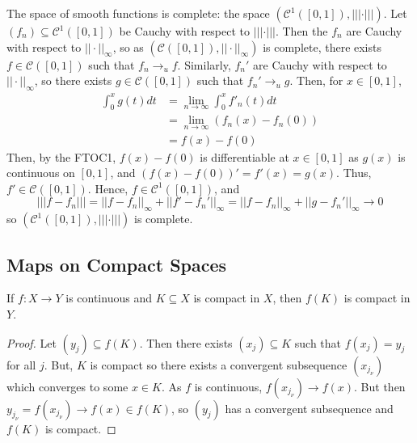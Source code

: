 \begin{example}
    The space of smooth functions is complete: the space $(\mathcal{C}^1([0,1]), |||\cdot|||)$. Let $(f_n) \subseteq \mathcal{C}^1([0,1])$ be Cauchy with respect to $|||\cdot|||$. Then the $f_n$ are Cauchy with respect to $||\cdot||_{\infty}$, so as $(\mathcal{C}([0,1]),||\cdot||_{\infty})$ is complete, there exists $f \in \mathcal{C}([0,1])$ such that $f_n\rightarrow_uf$. Similarly, $f_n'$ are Cauchy with respect to $||\cdot||_{\infty}$, so there exists $g \in \mathcal{C}([0,1])$ such that $f_n'\rightarrow_ug$. Then, for $x \in [0,1]$, \begin{align*}
        \int_0^xg(t)dt &= \lim\limits_{n\rightarrow \infty}\int_0^xf'_n(t)dt \tag{by uniform convergence} \\
        &= \lim\limits_{n\rightarrow \infty}(f_n(x)-f_n(0)) \tag{by FTOC2} \\
        &= f(x) - f(0) \tag{by pointwise convergence}
    \end{align*}
    Then, by the FTOC1, $f(x)-f(0)$ is differentiable at $x \in [0,1]$ as $g(x)$ is continuous on $[0,1]$, and $(f(x)-f(0))' = f'(x) = g(x)$. Thus, $f' \in \mathcal{C}([0,1])$. Hence, $f \in \mathcal{C}^1([0,1])$, and $$|||f-f_n||| = ||f-f_n||_{\infty} + ||f'-f_n'||_{\infty} = ||f-f_n||_{\infty} + ||g-f_n'||_{\infty}\rightarrow 0$$ so $(\mathcal{C}^1([0,1]),|||\cdot|||)$ is complete.
\end{example}






\subsection{Maps on Compact Spaces}

\begin{proposition}\label{prop:3.1.2}
    If $f:X\rightarrow Y$ is continuous and $K \subseteq X$ is compact in $X$, then $f(K)$ is compact in $Y$.
\end{proposition}
\begin{proof}
    Let $(y_j) \subseteq f(K)$. Then there exists $(x_j) \subseteq K$ such that $f(x_j) = y_j$ for all $j$. But, $K$ is compact so there exists a convergent subsequence $(x_{j_{\nu}})$ which converges to some $x \in K$. As $f$ is continuous, $f(x_{j_{\nu}})\rightarrow f(x)$. But then $y_{j_{\nu}} = f(x_{j_{\nu}})\rightarrow f(x) \in f(K)$, so $(y_j)$ has a convergent subsequence and $f(K)$ is compact.
\end{proof}


